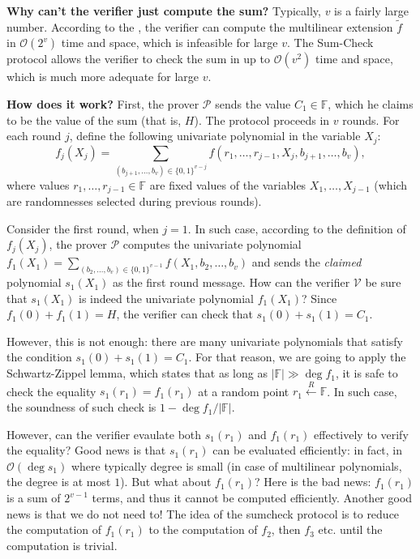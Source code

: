 \documentclass{gkr-template}
\begin{document}
\textbf{Why can't the verifier just compute the sum?} Typically, $v$ is a fairly
large number. According to the ,
the verifier can compute the multilinear extension $\widetilde{f}$ in
$\mathcal{O}(2^v)$ time and space, which is infeasible for large $v$. The
Sum-Check protocol allows the verifier to check the sum in up to
$\mathcal{O}(v^2)$ time and space, which is much more adequate for large $v$.

\textbf{How does it work?} First, the prover $\mathcal{P}$ sends the value $C_1
\in \mathbb{F}$, which he claims to be the value of the sum (that is, $H$).
The protocol proceeds in $v$ rounds. For each round $j$, define the 
following univariate polynomial in the variable $X_j$:
\begin{equation*}
    f_j(X_j) = \sum_{(b_{j+1},\dots,b_v) \in \{0,1\}^{v-j}} f(r_1,\dots,r_{j-1},X_j,b_{j+1},\dots,b_v),
\end{equation*}
where values $r_1,\dots,r_{j-1} \in \mathbb{F}$ are fixed values of the
variables $X_1,\dots,X_{j-1}$ (which are randomnesses selected during previous
rounds).

Consider the first round, when $j=1$. In such case, according to the definition
of $f_j(X_j)$, the prover $\mathcal{P}$ computes the univariate polynomial
$f_1(X_1) = \sum_{(b_2,\dots,b_v) \in \{0,1\}^{v-1}} f(X_1,b_2,\dots,b_v)$ and 
sends the \textit{claimed} polynomial $s_1(X_1)$ as the first round message.
How can the verifier $\mathcal{V}$ be sure that $s_1(X_1)$ is indeed the
univariate polynomial $f_1(X_1)$? Since $f_1(0) + f_1(1) = H$, the verifier
can check that $s_1(0) + s_1(1) = C_1$. 

However, this is not enough: there are many univariate polynomials that satisfy
the condition $s_1(0) + s_1(1) = C_1$. For that reason, we are going to apply
the Schwartz-Zippel lemma, which states that as long as $|\mathbb{F}| \gg \deg
f_1$, it is safe to check the equality $s_1(r_1) = f_1(r_1)$ at a random point
$r_1 \xleftarrow{R} \mathbb{F}$. In such case, the soundness of such check is
$1-\deg f_1/|\mathbb{F}|$. 

However, can the verifier evaulate both $s_1(r_1)$ and $f_1(r_1)$ effectively to
verify the equality? Good news is that $s_1(r_1)$ can be evaluated efficiently: in
fact, in $\mathcal{O}(\deg s_1)$ where typically degree is small (in case of
multilinear polynomials, the degree is at most $1$). But what about $f_1(r_1)$?
Here is the bad news: $f_1(r_1)$ is a sum of $2^{v-1}$ terms, and thus it cannot
be computed efficiently. Another good news is that we do not need to! The idea
of the sumcheck protocol is to reduce the computation of $f_1(r_1)$ to the
computation of $f_2$, then $f_3$ etc. until the computation is trivial. 
\end{document}
